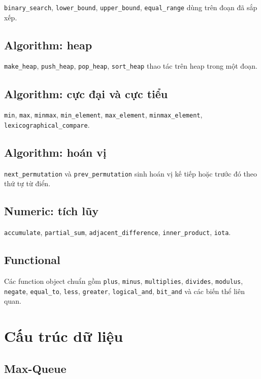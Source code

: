 \documentclass[11pt]{article}
\begin{document}
\texttt{binary\_search}, \texttt{lower\_bound}, \texttt{upper\_bound}, \texttt{equal\_range} dùng trên đoạn đã sắp xếp.

\subsection{Algorithm: heap}

\texttt{make\_heap}, \texttt{push\_heap}, \texttt{pop\_heap}, \texttt{sort\_heap} thao tác trên heap trong một đoạn.

\subsection{Algorithm: cực đại và cực tiểu}

\texttt{min}, \texttt{max}, \texttt{minmax}, \texttt{min\_element}, \texttt{max\_element}, \texttt{minmax\_element}, \texttt{lexicographical\_compare}.

\subsection{Algorithm: hoán vị}

\texttt{next\_permutation} và \texttt{prev\_permutation} sinh hoán vị kế tiếp hoặc trước đó theo thứ tự từ điển.

\subsection{Numeric: tích lũy}

\texttt{accumulate}, \texttt{partial\_sum}, \texttt{adjacent\_difference}, \texttt{inner\_product}, \texttt{iota}.

\subsection{Functional}

Các function object chuẩn gồm \texttt{plus}, \texttt{minus}, \texttt{multiplies}, \texttt{divides}, \texttt{modulus}, \texttt{negate}, \texttt{equal\_to}, \texttt{less}, \texttt{greater}, \texttt{logical\_and}, \texttt{bit\_and} và các biến thể liên quan.

\clearpage

\section{Cấu trúc dữ liệu}

\subsection{Max-Queue}
\end{document}
